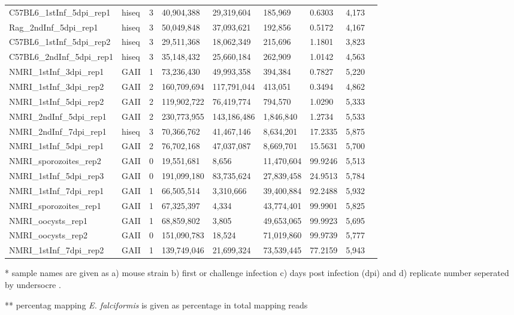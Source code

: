 \documentclass{bmcart}
\begin{document}
\begin{backmatter}
\begin{table}[ht]
\begin{tabular}{lllllllll}
  C57BL6\_1stInf\_5dpi\_rep1 & hiseq & 3 & 40,904,388 & 29,319,604 & 185,969 & 0.6303 & 4,173 \\ 
  Rag\_2ndInf\_5dpi\_rep1 & hiseq & 3 & 50,049,848 & 37,093,621 & 192,856 & 0.5172 & 4,167 \\ 
  C57BL6\_1stInf\_5dpi\_rep2 & hiseq & 3 & 29,511,368 & 18,062,349 & 215,696 & 1.1801 & 3,823 \\ 
  C57BL6\_2ndInf\_5dpi\_rep1 & hiseq & 3 & 35,148,432 & 25,660,184 & 262,909 & 1.0142 & 4,563 \\ 
  NMRI\_1stInf\_3dpi\_rep1 & GAII & 1 & 73,236,430 & 49,993,358 & 394,384 & 0.7827 & 5,220 \\ 
  NMRI\_1stInf\_3dpi\_rep2 & GAII & 2 & 160,709,694 & 117,791,044 & 413,051 & 0.3494 & 4,862 \\ 
  NMRI\_1stInf\_5dpi\_rep2 & GAII & 2 & 119,902,722 & 76,419,774 & 794,570 & 1.0290 & 5,333 \\ 
  NMRI\_2ndInf\_5dpi\_rep1 & GAII & 2 & 230,773,955 & 143,186,486 & 1,846,840 & 1.2734 & 5,533 \\ 
  NMRI\_2ndInf\_7dpi\_rep1 & hiseq & 3 & 70,366,762 & 41,467,146 & 8,634,201 & 17.2335 & 5,875 \\ 
  NMRI\_1stInf\_5dpi\_rep1 & GAII & 2 & 76,702,168 & 47,037,087 & 8,669,701 & 15.5631 & 5,700 \\ 
  NMRI\_sporozoites\_rep2 & GAII & 0 & 19,551,681 & 8,656 & 11,470,604 & 99.9246 & 5,513 \\ 
  NMRI\_1stInf\_5dpi\_rep3 & GAII & 0 & 191,099,180 & 83,735,624 & 27,839,458 & 24.9513 & 5,784 \\ 
  NMRI\_1stInf\_7dpi\_rep1 & GAII & 1 & 66,505,514 & 3,310,666 & 39,400,884 & 92.2488 & 5,932 \\ 
  NMRI\_sporozoites\_rep1 & GAII & 1 & 67,325,397 & 4,334 & 43,774,401 & 99.9901 & 5,825 \\ 
  NMRI\_oocysts\_rep1 & GAII & 1 & 68,859,802 & 3,805 & 49,653,065 & 99.9923 & 5,695 \\ 
  NMRI\_oocysts\_rep2 & GAII & 0 & 151,090,783 & 18,524 & 71,019,860 & 99.9739 & 5,777 \\ 
  NMRI\_1stInf\_7dpi\_rep2 & GAII & 1 & 139,749,046 & 21,699,324 & 73,539,445 & 77.2159 & 5,943 \\ 
   \hline
\end{tabular}
\begin{tablenotes}[flushleft]\footnotesize\singlespacing
\item{*} sample names are given as a) mouse strain b) first or challenge
  infection c) days post infection (dpi) and d) replicate number
  seperated by undersocre . \\
\item{**} percentag mapping \textit{E. falciformis} is given as percentage in total mapping reads
\end{tablenotes}
\end{table}
\hspace*{+2.5cm}






\end{backmatter}
\end{document}
